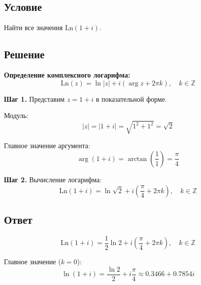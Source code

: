 \documentclass[12pt,a4paper]{article}
\begin{document}
\subsection{Условие}
Найти все значения $\text{Ln}(1+i)$. 

\subsection{Решение}

\textbf{Определение комплексного логарифма:}
\[
\text{Ln}(z) = \ln|z| + i(\arg z + 2\pi k), \quad k \in \mathbb{Z}
\]

\textbf{Шаг 1. } Представим $z = 1 + i$ в показательной форме. 

Модуль:
\[
|z| = |1+i| = \sqrt{1^2 + 1^2} = \sqrt{2}
\]

Главное значение аргумента:
\[
\arg(1+i) = \arctan\left(\frac{1}{1}\right) = \frac{\pi}{4}
\]

\textbf{Шаг 2.} Вычисление логарифма:
\[
\text{Ln}(1+i) = \ln\sqrt{2} + i\left(\frac{\pi}{4} + 2\pi k\right), \quad k \in \mathbb{Z}
\]

\subsection{Ответ}
\[
\boxed{\text{Ln}(1+i) = \frac{1}{2}\ln 2 + i\left(\frac{\pi}{4} + 2\pi k\right), \quad k \in \mathbb{Z}}
\]

Главное значение ($k = 0$):
\[
\ln(1+i) = \frac{\ln 2}{2} + i\frac{\pi}{4} \approx 0. 3466 + 0. 7854i
\]






\end{document}
